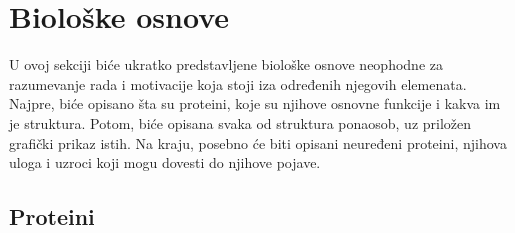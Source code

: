 \chapter{Biološke osnove} %
\label{bioloskeosnove} %

U ovoj sekciji biće ukratko predstavljene biološke osnove neophodne za razumevanje rada i motivacije koja stoji iza određenih njegovih elemenata.
Najpre, biće opisano šta su proteini, koje su njihove osnovne funkcije i kakva im je struktura. Potom, biće opisana svaka od struktura ponaosob, uz priložen grafički prikaz istih. Na kraju, posebno će biti opisani neuređeni proteini, njihova uloga i uzroci koji mogu dovesti do njihove pojave. 

\section{Proteini}
\label{sec:proteini}

